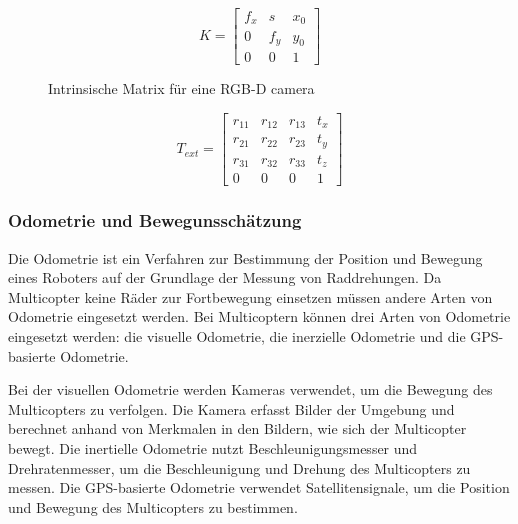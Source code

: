 \begin{figure}
\begin{equation*}
    K = \begin{bmatrix}
    f_x & s & x_0 \\
    0 & f_y & y_0 \\
    0 & 0 & 1
    \end{bmatrix}
    \end{equation*}
    \caption{Intrinsische Matrix für eine \ac{RGB-D} camera}
\end{figure}

\begin{figure}
    \begin{equation*}
        T_{ext}=\begin{bmatrix}
            r_{11} & r_{12} & r_{13} & t_x\\
            r_{21} & r_{22} & r_{23} & t_y\\
            r_{31} & r_{32} & r_{33} & t_z\\
            0 & 0 & 0 & 1
            \end{bmatrix}   
    \end{equation*}
\end{figure}

\subsubsection{Odometrie und Bewegunsschätzung}

Die Odometrie ist ein Verfahren zur Bestimmung der Position und Bewegung eines Roboters auf der Grundlage der Messung von Raddrehungen. Da Multicopter keine Räder zur Fortbewegung einsetzen müssen andere Arten von Odometrie eingesetzt werden. Bei Multicoptern können drei Arten von Odometrie eingesetzt werden: die visuelle Odometrie, die inerzielle Odometrie und die GPS-basierte Odometrie.


Bei der visuellen Odometrie werden Kameras verwendet, um die Bewegung des Multicopters zu verfolgen. Die Kamera erfasst Bilder der Umgebung und berechnet anhand von Merkmalen in den Bildern, wie sich der Multicopter bewegt. Die inertielle Odometrie nutzt Beschleunigungsmesser und Drehratenmesser, um die Beschleunigung und Drehung des Multicopters zu messen. Die GPS-basierte Odometrie verwendet Satellitensignale, um die Position und Bewegung des Multicopters zu bestimmen.

